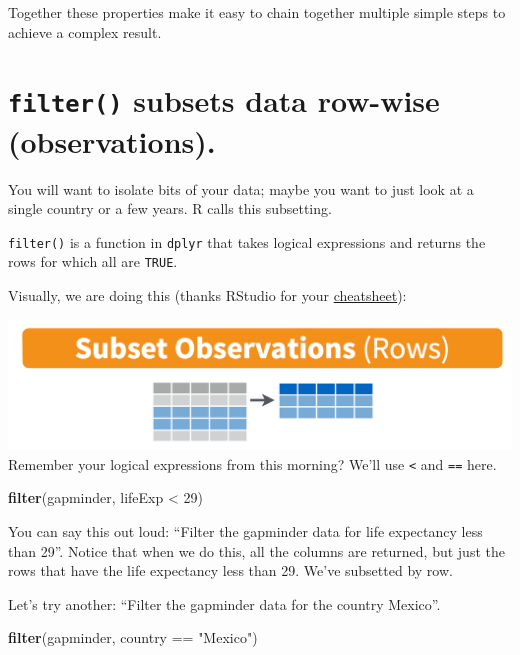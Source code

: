 \documentclass[]{book}
\newenvironment{Shaded}{\begin{snugshade}}{\end{snugshade}}
\newcommand{\KeywordTok}[1]{\textcolor[rgb]{0.13,0.29,0.53}{\textbf{{#1}}}}
\newcommand{\DecValTok}[1]{\textcolor[rgb]{0.00,0.00,0.81}{{#1}}}
\newcommand{\StringTok}[1]{\textcolor[rgb]{0.31,0.60,0.02}{{#1}}}
\newcommand{\NormalTok}[1]{{#1}}
\theoremstyle{definition}
\theoremstyle{definition}
\theoremstyle{definition}
\theoremstyle{remark}
\begin{document}
Together these properties make it easy to chain together multiple simple
steps to achieve a complex result.

\section{\texorpdfstring{\texttt{filter()} subsets data row-wise
(observations).}{filter() subsets data row-wise (observations).}}\label{filter-subsets-data-row-wise-observations.}

You will want to isolate bits of your data; maybe you want to just look
at a single country or a few years. R calls this subsetting.

\texttt{filter()} is a function in \texttt{dplyr} that takes logical
expressions and returns the rows for which all are \texttt{TRUE}.

Visually, we are doing this (thanks RStudio for your
\href{http://www.rstudio.com/wp-content/uploads/2015/02/data-wrangling-cheatsheet.pdf}{cheatsheet}):

\includegraphics{img/rstudio-cheatsheet-filter.png} Remember your
logical expressions from this morning? We'll use \texttt{\textless{}}
and \texttt{==} here.

\begin{Shaded}
\begin{Highlighting}[]
\KeywordTok{filter}\NormalTok{(gapminder, lifeExp <}\StringTok{ }\DecValTok{29}\NormalTok{)}
\end{Highlighting}
\end{Shaded}

You can say this out loud: ``Filter the gapminder data for life
expectancy less than 29''. Notice that when we do this, all the columns
are returned, but just the rows that have the life expectancy less than
29. We've subsetted by row.

Let's try another: ``Filter the gapminder data for the country Mexico''.

\begin{Shaded}
\begin{Highlighting}[]
\KeywordTok{filter}\NormalTok{(gapminder, country ==}\StringTok{ "Mexico"}\NormalTok{)}
\end{Highlighting}
\end{Shaded}
\end{document}
